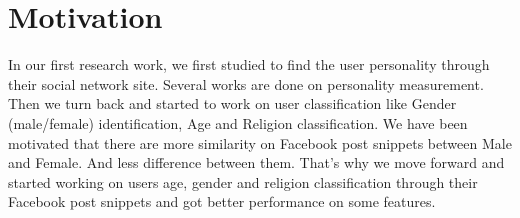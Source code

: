 \documentclass{standalone}
\begin{document}
\section{Motivation}
In our first research work, we first studied to find the user personality through their social network site. Several works are done on personality measurement. Then we turn back and started to work on user classification like Gender (male/female) identification, Age and Religion classification. We have been motivated that there are more similarity on Facebook post snippets between Male and Female. And less difference between them. That's why we move forward and started working on users age, gender and religion classification through their Facebook post snippets and got better performance on some features.
\end{document}
